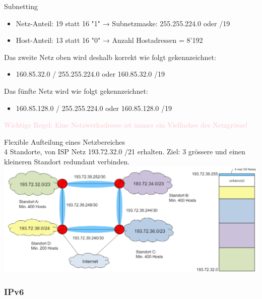 \begin{concept}{Subnetting}
    \begin{itemize}
        \item Netz-Anteil: 19 statt 16 "1" → Subnetzmaske: 255.255.224.0 oder /19
        \item Host-Anteil: 13 statt 16 "0" → Anzahl Hostadressen = 8'192
    \end{itemize}
    Das zweite Netz oben wird deshalb korrekt wie folgt gekennzeichnet:
    \begin{itemize}
        \item 160.85.32.0 / 255.255.224.0 oder 160.85.32.0 /19
    \end{itemize}
    Das fünfte Netz wird wie folgt gekennzeichnet:
    \begin{itemize}
        \item 160.85.128.0 / 255.255.224.0 oder 160.85.128.0 /19
    \end{itemize}
    \textcolor{pink}{Wichtige Regel: Eine Netzwerkadresse ist immer ein Vielfaches der Netzgrösse!}
\end{concept}

\begin{example2}{Flexible Aufteilung eines Netzbereiches}\\
    4 Standorte, von ISP Netz 193.72.32.0 /21 erhalten. Ziel: 3 grössere und einen kleineren Standort redundant verbinden.\\
        \includegraphics[width=1\linewidth]{images/flexible_aufteilung_netzbereich.png}    
\end{example2}



\subsubsection{IPv6}

